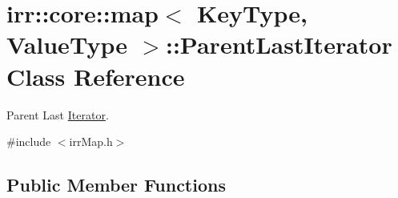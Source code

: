 \hypertarget{classirr_1_1core_1_1map_1_1ParentLastIterator}{}\section{irr\+:\+:core\+:\+:map$<$ Key\+Type, Value\+Type $>$\+:\+:Parent\+Last\+Iterator Class Reference}
\label{classirr_1_1core_1_1map_1_1ParentLastIterator}


Parent Last \hyperlink{classirr_1_1core_1_1map_1_1Iterator}{Iterator}.  




{\ttfamily \#include $<$irr\+Map.\+h$>$}

\subsection*{Public Member Functions}
